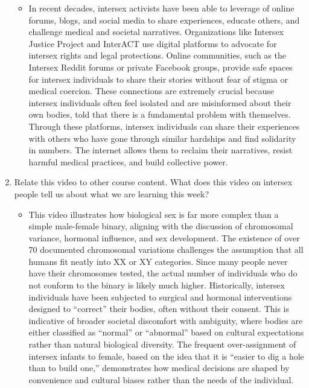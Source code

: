 \documentclass{article}
\begin{document}
\begin{enumerate}
\begin{itemize}
  \item In recent decades, intersex activists have been able to leverage of online forums, blogs, and social media to share experiences, educate others, and challenge medical and societal narratives. Organizations like Intersex Justice Project and InterACT use digital platforms to advocate for intersex rights and legal protections.	Online communities, such as the Intersex Reddit forums or private Facebook groups, provide safe spaces for intersex individuals to share their stories without fear of stigma or medical coercion. These connections are extremely crucial because intersex individuals often feel isolated and are misinformed about their own bodies, told that there is a fundamental problem with themselves. Through these platforms, intersex individuals can share their experiences with others who have gone through similar hardships and find solidarity in numbers. The internet allows them to reclaim their narratives, resist harmful medical practices, and build collective power.
  \end{itemize}
  \item Relate this video to other course content. What does this video on intersex people tell us about what we are learning this week?
  \begin{itemize}
  \item This video illustrates how biological sex is far more complex than a simple male-female binary, aligning with the discussion of chromosomal variance, hormonal influence, and sex development. The existence of over 70 documented chromosomal variations challenges the assumption that all humans fit neatly into XX or XY categories. Since many people never have their chromosomes tested, the actual number of individuals who do not conform to the binary is likely much higher. Historically, intersex individuals have been subjected to surgical and hormonal interventions designed to ``correct'' their bodies, often without their consent. This is indicative of broader societal discomfort with ambiguity, where bodies are either classified as ``normal'' or ``abnormal'' based on cultural expectations rather than natural biological diversity. The frequent over-assignment of intersex infants to female, based on the idea that it is ``easier to dig a hole than to build one,'' demonstrates how medical decisions are shaped by convenience and cultural biases rather than the needs of the individual.
  \end{itemize}

\end{enumerate}
\end{document}
